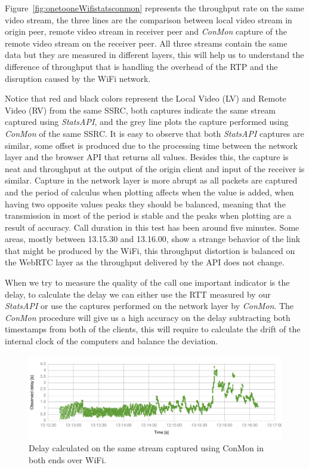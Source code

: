 Figure~\ref{fig:onetooneWifistatsconmon} represents the throughput rate on the same video stream, the three lines are the comparison between local video stream in origin peer, remote video stream in receiver peer and {\it ConMon} capture of the remote video stream on the receiver peer. All three streams contain the same data but they are measured in different layers, this will help us to understand the difference of throughput that is handling the overhead of the RTP and the disruption caused by the WiFi network.

Notice that red and black colors represent the Local Video (LV) and Remote Video (RV) from the same SSRC, both captures indicate the same stream captured using {\it StatsAPI}, and the grey line plots the capture performed using {\it ConMon} of the same SSRC. It is easy to observe that both {\it StatsAPI} captures are similar, some offset is produced due to the processing time between the network layer and the browser API that returns all values. Besides this, the capture is neat and throughput at the output of the origin client and input of the receiver is similar. Capture in the network layer is more abrupt as all packets are captured and the period of calculus when plotting affects when the value is added, when having two opposite values peaks they should be balanced, meaning that the transmission in most of the period is stable and the peaks when plotting are a result of accuracy. Call duration in this test has been around five minutes. Some areas, mostly between 13.15.30 and 13.16.00, show a strange behavior of the link that might be produced by the WiFi, this throughput distortion is balanced on the WebRTC layer as the throughput delivered by the API does not change.

When we try to measure the quality of the call one important indicator is the delay, to calculate the delay we can either use the RTT measured by our {\it StatsAPI} or use the captures performed on the network layer by {\it ConMon}. The {\it ConMon} procedure will give us a high accuracy on the delay subtracting both timestamps from both of the clients, this will require to calculate the drift of the internal clock of the computers and balance the deviation.

 \begin{figure}[h]
  \centering
    \includegraphics[width=1\textwidth]{./figures/delay_116_646227.pdf}
      \caption[Delay calculated on the same stream captured using ConMon in both ends over WiFi]{Delay calculated on the same stream captured using ConMon in both ends over WiFi.}
	\label{fig:delay_116_646227}
\end{figure}

